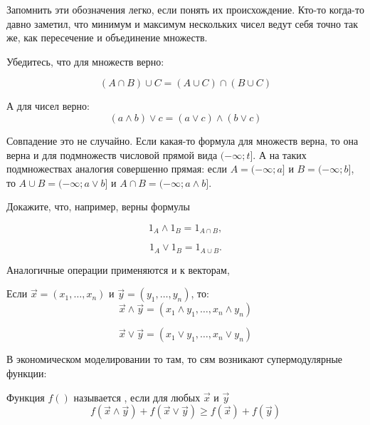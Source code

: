 Запомнить эти обозначения легко, если понять их происхождение. Кто-то когда-то давно заметил, что минимум и максимум нескольких чисел ведут себя точно так же, как пересечение и объединение множеств.

Убедитесь, что для множеств верно:

\begin{equation}
(A \cap B)\cup C=(A\cup C)\cap (B\cup C)
\end{equation}

А для чисел верно:
\begin{equation}
(a \wedge b)\vee c=(a\vee c)\wedge (b\vee c)
\end{equation}

Совпадение это не случайно. Если какая-то формула для множеств верна, то она верна и для подмножеств числовой прямой вида $ (-\infty;t] $. А на таких подмножествах аналогия совершенно прямая: если $ A=(-\infty;a] $ и $ B=(-\infty;b] $, то $ A\cup B= (-\infty;a\vee b] $ и $ A\cap B=(-\infty;a\wedge b] $.

Докажите, что, например, верны формулы

\begin{equation}
1_{A}\wedge 1_{B}=1_{A\cap B},
\end{equation}

\begin{equation}
1_{A}\vee 1_{B}=1_{A\cup B}.
\end{equation}



Аналогичные операции применяются и к векторам,

\begin{mydef} Если $ \vec{x}=(x_{1},\ldots, x_{n}) $ и $ \vec{y}=(y_{1},\ldots, y_{n}) $, то:
\begin{equation}
\vec{x}\wedge\vec{y}=(x_{1}\wedge y_{1}, \ldots, x_{n}\wedge y_{n})
\end{equation}

\begin{equation}
\vec{x}\vee\vec{y}=(x_{1}\vee y_{1}, \ldots, x_{n}\vee y_{n})
\end{equation}

\end{mydef}


В экономическом моделировании то там, то сям возникают супермодулярные функции:

\begin{mydef} Функция $ f() $ называется , если для любых $ \vec{x} $ и $ \vec{y} $
\begin{equation}
f(\vec{x}\wedge\vec{y})+f(\vec{x}\vee\vec{y})\geq f(\vec{x})+f(\vec{y})
\end{equation}

\end{mydef}

